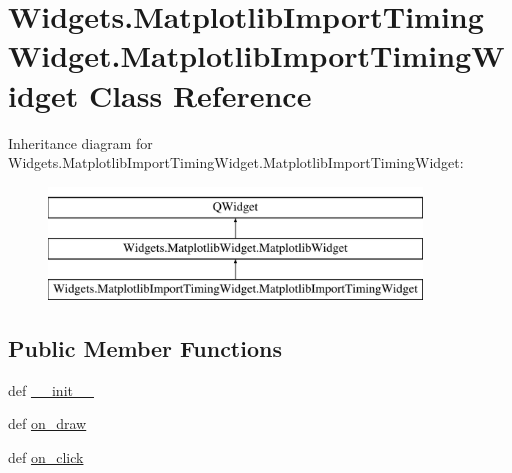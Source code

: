 \hypertarget{classWidgets_1_1MatplotlibImportTimingWidget_1_1MatplotlibImportTimingWidget}{\section{Widgets.\-Matplotlib\-Import\-Timing\-Widget.\-Matplotlib\-Import\-Timing\-Widget Class Reference}
\label{classWidgets_1_1MatplotlibImportTimingWidget_1_1MatplotlibImportTimingWidget}
}
Inheritance diagram for Widgets.\-Matplotlib\-Import\-Timing\-Widget.\-Matplotlib\-Import\-Timing\-Widget\-:\begin{figure}[H]
\begin{center}
\leavevmode
\includegraphics[height=3.000000cm]{classWidgets_1_1MatplotlibImportTimingWidget_1_1MatplotlibImportTimingWidget}
\end{center}
\end{figure}
\subsection*{Public Member Functions}
\begin{DoxyCompactItemize}
\item 
def \hyperlink{classWidgets_1_1MatplotlibImportTimingWidget_1_1MatplotlibImportTimingWidget_ae14615610f18f54d5fc711b262a63bd6}{\-\_\-\-\_\-init\-\_\-\-\_\-}
\item 
def \hyperlink{classWidgets_1_1MatplotlibImportTimingWidget_1_1MatplotlibImportTimingWidget_a040c772973ab8852b0ac2d13a594b7de}{on\-\_\-draw}
\item 
def \hyperlink{classWidgets_1_1MatplotlibImportTimingWidget_1_1MatplotlibImportTimingWidget_a6ae365302597a376c26abd756f64feda}{on\-\_\-click}
\end{DoxyCompactItemize}
